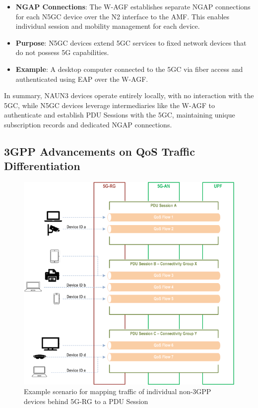 \begin{itemize}
{\begin{itemize}
{            }
            \item {
                \textbf{\ac{NGAP} Connections}: The \ac{W-AGF} establishes separate \ac{NGAP} connections for each \ac{N5GC} device over the N2 interface to the \ac{AMF}. This enables individual session and mobility management for each device.
            }
            \item {
                \textbf{Purpose}: \ac{N5GC} devices extend \ac{5GC} services to fixed network devices that do not possess \ac{5G} capabilities.
            }
            \item {
                \textbf{Example}: A desktop computer connected to the \ac{5GC} via fiber access and authenticated using \ac{EAP} over the \ac{W-AGF}.
            }
        \end{itemize}    
    }
\end{itemize}

In summary, \ac{NAUN3} devices operate entirely locally, with no interaction with the \ac{5GC}, while \ac{N5GC} devices leverage intermediaries like the \ac{W-AGF} to authenticate and establish \ac{PDU} Sessions with the \ac{5GC}, maintaining unique subscription records and dedicated \ac{NGAP} connections.

\subsection{\ac{3GPP} Advancements on \ac{QoS} Traffic Differentiation}

\begin{figure}
    \centering
    \includegraphics[width=0.75\linewidth]{figs/Example scenario for mapping traffic of individual non-3GPP devices behind 5G-RG to a PDU Session.png}
    \caption{Example scenario for mapping traffic of individual non-\ac{3GPP} devices behind \ac{5G-RG} to a \ac{PDU} Session}
    \label{fig:Example scenario for mapping traffic of individual non-3GPP devices behind 5G-RG to a PDU Session}
\end{figure}

